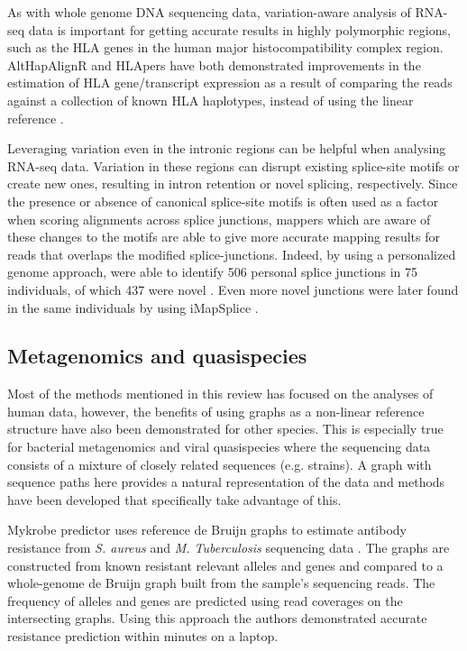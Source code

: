 As with whole genome DNA sequencing data, variation-aware analysis of RNA-seq data is important for getting accurate results in highly polymorphic regions, such as the HLA genes in the human major histocompatibility complex region. 
AltHapAlignR and HLApers have both demonstrated improvements in the estimation of HLA gene/transcript expression as a result of comparing the reads against a collection of known HLA haplotypes, instead of using the linear reference \cite{Lee_2018,Aguiar2019-fy}.

Leveraging variation even in the intronic regions can be helpful when analysing RNA-seq data. 
Variation in these regions can disrupt existing splice-site motifs or create new ones, resulting in intron retention or novel splicing, respectively. 
Since the presence or absence of canonical splice-site motifs is often used as a factor when scoring alignments across splice junctions, mappers which are aware of these changes to the motifs are able to give more accurate mapping results for reads that overlaps the modified splice-junctions. 
Indeed, by using a personalized genome approach, \citeauthor{Stein_2015} were able to identify 506 personal splice junctions in 75 individuals, of which 437 were novel \cite{Stein_2015}.
Even more novel junctions were later found in the same individuals by \citeauthor{Liu_2018} using iMapSplice \cite{Liu_2018}.

\subsection{Metagenomics and quasispecies}

Most of the methods mentioned in this review has focused on the analyses of human data, however, the benefits of using graphs as a non-linear reference structure have also been demonstrated for other species.
This is especially true for bacterial metagenomics and viral quasispecies where the sequencing data consists of a mixture of closely related sequences (e.g. strains).
A graph with sequence paths here provides a natural representation of the data and methods have been developed that specifically take advantage of this. 

Mykrobe predictor uses reference de Bruijn graphs to estimate antibody resistance from \textit{S. aureus} and \textit{M. Tuberculosis} sequencing data \cite{Bradley2015-kl}.
The graphs are constructed from known resistant relevant alleles and genes and compared to a whole-genome de Bruijn graph built from the sample's sequencing reads.
The frequency of alleles and genes are predicted using read coverages on the intersecting graphs.
Using this approach the authors demonstrated accurate resistance prediction within minutes on a laptop.  

